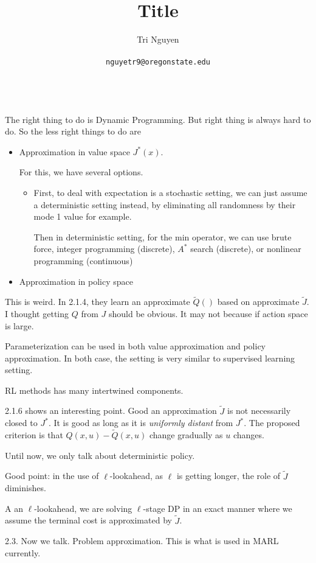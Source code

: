 \documentclass[11pt,a4paper]{article}
\title{Title}
\author{	Tri Nguyen \\\\
        \texttt{nguyetr9@oregonstate.edu} \\\\
        }
\begin{document}
\maketitle

The right thing to do is Dynamic Programming. But right thing is always hard to do. So the less right things to do are
\begin{itemize}
    \item Approximation in value space $J^{*}(x)$.

        For this, we have several options.
        \begin{itemize}
            \item First, to deal with expectation is a stochastic setting, we can just assume a deterministic setting instead, by eliminating all randomness by their mode 1 value for example.

                Then in deterministic setting, for the min operator, we can use brute force, integer programming (discrete), $A^{*}$ search (discrete), or nonlinear programming (continuous)
        \end{itemize}
    \item Approximation in policy space 
\end{itemize}
This is weird. In 2.1.4, they learn an approximate $\widetilde{Q}()$ based on approximate $\widetilde{J}$. I thought getting $Q$ from $J$ should be obvious. It may not because if action space is large.

Parameterization can be used in both value approximation and policy approximation. In both case, the setting is very similar to supervised learning setting.

RL methods has many intertwined components.

2.1.6 shows an interesting point. Good an approximation $\widetilde{J}$ is not necessarily closed to $J^{*}$. It is good as long as it is \textit{uniformly distant} from $J^{*}$. The proposed criterion is that $Q(x, u) -\widetilde{Q}(x, u)$ change gradually as $u$ changes.

Until now, we only talk about deterministic policy.

Good point: in the use of $\ell$-lookahead, as $\ell$ is getting longer, the role of $\widetilde{J}$ diminishes.

A an $\ell$-lookahead, we are solving $\ell$-stage DP in an exact manner where we assume the terminal cost is approximated by $\widetilde{J}$.

2.3. Now we talk. Problem approximation.
This is what is used in MARL currently.
\end{document}
